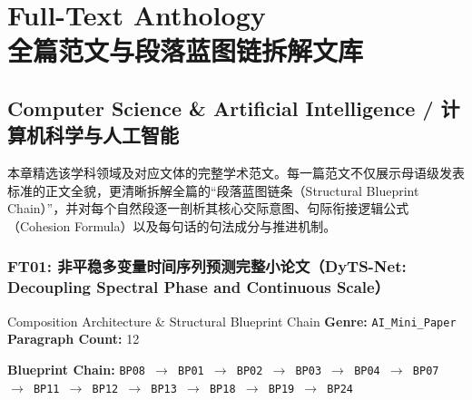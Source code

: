 \part{Full-Text Anthology \\ 全篇范文与段落蓝图链拆解文库}\label{part:anthology}

\chapter{Computer Science \& Artificial Intelligence / 计算机科学与人工智能}\label{ch:anthology_18}
本章精选该学科领域及对应文体的完整学术范文。每一篇范文不仅展示母语级发表标准的正文全貌，更清晰拆解全篇的“段落蓝图链条（Structural Blueprint Chain）”，并对每个自然段逐一剖析其核心交际意图、句际衔接逻辑公式（Cohesion Formula）以及每句话的句法成分与推进机制。

\section{FT01: 非平稳多变量时间序列预测完整小论文（DyTS-Net: Decoupling Spectral Phase and Continuous Scale）}\label{comp:FT01}
\begin{ConceptBox}{Composition Architecture \& Structural Blueprint Chain}
\textbf{Genre:} \texttt{AI\_Mini\_Paper} \quad \textbf{Paragraph Count:} 12\par
\textbf{Blueprint Chain:} \texttt{BP08 $\to$ BP01 $\to$ BP02 $\to$ BP03 $\to$ BP04 $\to$ BP07 $\to$ BP11 $\to$ BP12 $\to$ BP13 $\to$ BP18 $\to$ BP19 $\to$ BP24}
\end{ConceptBox}
